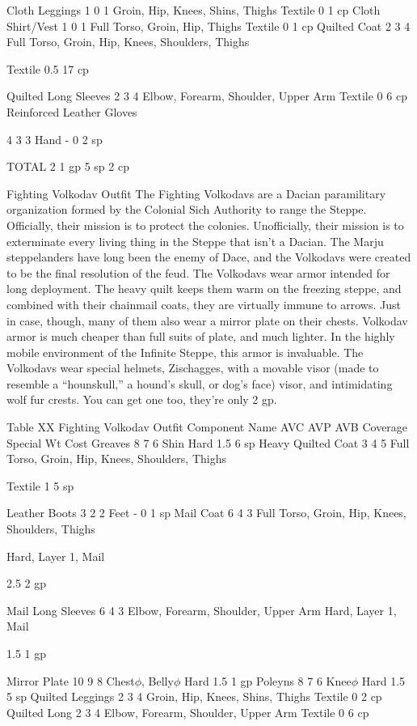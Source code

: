 \documentclass[oneside,11pt,english]{book}
\begin{document}
Cloth Leggings 1 0 1 Groin, Hip, Knees, Shins, Thighs Textile 0 1 cp 
Cloth Shirt/Vest 1 0 1 Full Torso, Groin, Hip, Thighs Textile 0 1 cp 
Quilted Coat 2 3 4 Full Torso, Groin, Hip, Knees, Shoulders, 
Thighs 

Textile 0.5 17 cp 

Quilted Long Sleeves 2 3 4 Elbow, Forearm, Shoulder, Upper Arm Textile 0 6 cp 
Reinforced Leather 
Gloves 

4 3 3 Hand - 0 2 sp 

TOTAL 2 1 gp 
5 sp 
2 cp 
 

 

Fighting Volkodav Outfit 
The Fighting Volkodavs are a Dacian paramilitary organization formed by the Colonial Sich Authority to 
range the Steppe. Officially, their mission is to protect the colonies. Unofficially, their mission is to 
exterminate every living thing in the Steppe that isn't a Dacian. The Marju steppelanders have long been 
the enemy of Dace, and the Volkodavs were created to be the final resolution of the feud. The Volkodavs 
wear armor intended for long deployment. The heavy quilt keeps them warm on the freezing steppe, and 
combined with their chainmail coats, they are virtually immune to arrows. Just in case, though, many of 
them also wear a mirror plate on their chests. Volkodav armor is much cheaper than full suits of plate, and 
much lighter. In the highly mobile environment of the Infinite Steppe, this armor is invaluable. The 
Volkodavs wear special helmets, Zischagges, with a movable visor (made to resemble a “hounskull,” a 
hound's skull, or dog's face) visor, and intimidating wolf fur crests. You can get one too, they're only 2 gp. 

 
Table XX Fighting Volkodav Outfit 
Component Name AVC AVP AVB Coverage Special Wt Cost 
Greaves 8 7 6 Shin Hard 1.5 6 sp 
Heavy Quilted Coat 3 4 5 Full Torso, Groin, Hip, Knees, Shoulders, 
Thighs 

Textile 1 5 sp 

Leather Boots 3 2 2 Feet - 0 1 sp 
Mail Coat 6 4 3 Full Torso, Groin, Hip, Knees, Shoulders, 
Thighs 

Hard, Layer 1, 
Mail 

2.5 2 gp 

Mail Long Sleeves 6 4 3 Elbow, Forearm, Shoulder, Upper Arm Hard, Layer 1, 
Mail 

1.5 1 gp 

Mirror Plate 10 9 8 Chest$\phi$, Belly$\phi$ Hard 1.5 1 gp 
Poleyns 8 7 6 Knee$\phi$ Hard 1.5 5 sp 
Quilted Leggings 2 3 4 Groin, Hip, Knees, Shins, Thighs Textile 0 2 cp 
Quilted Long 2 3 4 Elbow, Forearm, Shoulder, Upper Arm Textile 0 6 cp 
\end{document}
